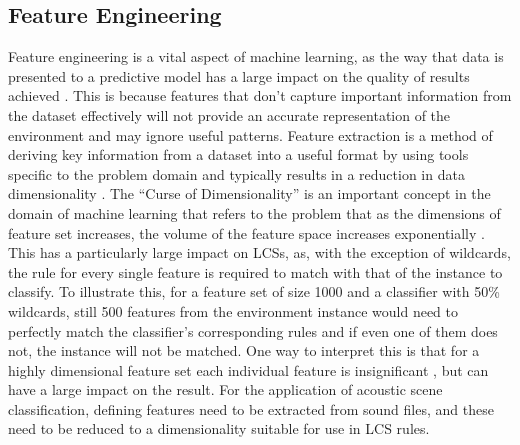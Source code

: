 \documentclass[11pt]{article}
\begin{document}
\begin{multicols}{2}
\subsection{Feature Engineering}
Feature engineering is a vital aspect of machine learning, as the way that data is presented to a predictive model has a large impact on the quality of results achieved \cite{Brownlee2014}. This is because features that don’t capture important information from the dataset effectively will not provide an accurate representation of the environment and may ignore useful patterns. Feature extraction is a method of deriving key information from a dataset into a useful format by using tools specific to the problem domain and typically results in a reduction in data dimensionality \cite{Howbert2012}. The “Curse of Dimensionality” is an important concept in the domain of machine learning that refers to the problem that as the dimensions of feature set increases, the volume of the feature space increases exponentially \cite{Keogh2010}. This has a particularly large impact on LCSs, as, with the exception of wildcards, the rule for every single feature is required to match with that of the instance to classify. To illustrate this, for a feature set of size 1000 and a classifier with 50\% wildcards, still 500 features from the environment instance would need to perfectly match the classifier’s corresponding rules and if even one of them does not, the instance will not be matched. One way to interpret this is that for a highly dimensional feature set each individual feature is insignificant \cite{Keogh2010}, but can have a large impact on the result.
For the application of acoustic scene classification, defining features need to be extracted from sound files, and these need to be reduced to a dimensionality suitable for use in LCS rules.


\end{multicols}
\end{document}
